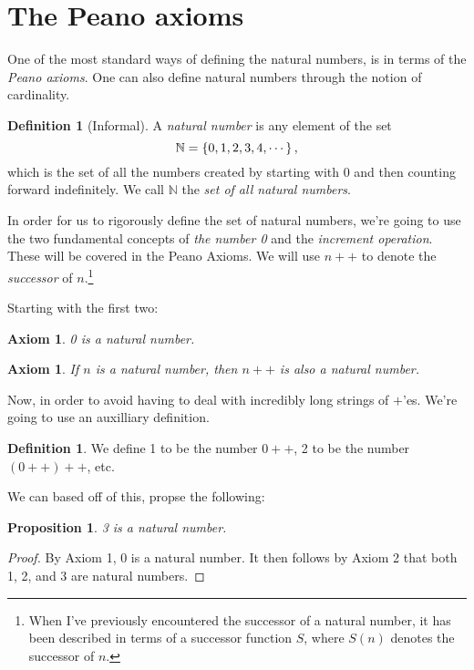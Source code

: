 \documentclass[a4paper, twocolumn]{report}
\newcounter{dummy} \numberwithin{dummy}{section}
\newcounter{axmcntr} \numberwithin{axmcntr}{chapter}
\newtheorem{axm}[axmcntr]{Axiom}
\newtheorem{prp}[dummy]{Proposition}
\theoremstyle{definition}
\newtheorem{defn}[dummy]{Definition}
\theoremstyle{solution}
\newcommand{\dplus}{{+}{+}} %
\begin{document}
\section{The Peano axioms}
One of the most standard ways of defining the natural numbers, is in terms of
the \textit{Peano axioms}. One can also define natural numbers through the
notion of cardinality.

\begin{defn}[Informal]
  \label{defn_211}
  A \textit{natural number} is any element of the set
  \begin{equation}
    \notag
    \mathbb{N} = \left\{ 0, 1, 2, 3, 4, \cdots \right\},
  \end{equation}
  which is the set of all the numbers created by starting with 0 and then
  counting forward indefinitely. We call $\mathbb{N}$ the \textit{set of all
  natural numbers}.
\end{defn}

In order for us to rigorously define the set of natural numbers, we're going to
use the two fundamental concepts of \textit{the number 0} and the
\textit{increment operation}.  These will be covered in the Peano Axioms.  We
will use $n\dplus$ to denote the \textit{successor} of $n$.\footnote{When I've
previously encountered the successor of a natural number, it has been described
in terms of a successor function $S$, where $S(n)$ denotes the successor of
$n$.}

Starting with the first two: 
\begin{axm}
  \label{axm_21}
  0 is a natural number.
\end{axm}
\begin{axm}
  \label{axm_22}
  If $n$ is a natural number, then $n\dplus$ is also a natural number.
\end{axm}

Now, in order to avoid having to deal with incredibly long strings of $+$'es.
We're going to use an auxilliary definition.
\addtocounter{dummy}{1}
\begin{defn}
  \label{defn_213}
  We define 1 to be the number $0\dplus$, 2 to be the number $(0\dplus)\dplus$, etc.
\end{defn}
We can based off of this, propse the following:

\begin{prp}
  \label{prp_214}
  3 is a natural number.
\end{prp}
\begin{proof}
  By Axiom 1, 0 is a natural number.
  It then follows by Axiom 2 that both 1, 2, and 3 are natural numbers.
\end{proof}
\end{document}

